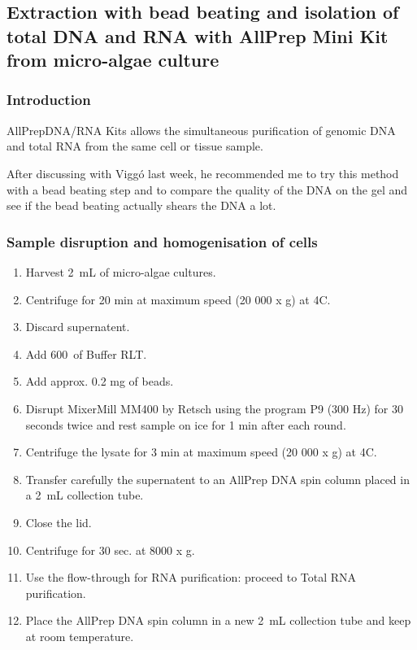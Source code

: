 \subsection{Extraction with bead beating and isolation of total DNA and RNA with  AllPrep Mini Kit from micro-algae culture}
\label{task:20180227_cj0}

\subsubsection{Introduction}
AllPrep\cR DNA/RNA Kits allows the simultaneous purification of genomic DNA and total RNA from the same cell or tissue sample.

After discussing with Viggó last week, he recommended me to try this method with a bead beating step and to compare the quality of the DNA on the gel and see if the bead beating actually shears the DNA a lot.

\subsubsection{Sample disruption and homogenisation of cells}

\begin{enumerate}
\item Harvest 2~mL of micro-algae cultures.
\item Centrifuge for 20 min at maximum speed (20 000 x g) at 4\degree C.
\item Discard supernatent.
\item Add 600~\uL of Buffer RLT.
\item Add approx. 0.2 mg of beads. 
\item Disrupt MixerMill MM400 by Retsch using the program P9 (300 Hz) for 30 seconds twice and rest sample on ice for 1 min after each round.
\item Centrifuge the lysate for 3 min at maximum speed (20 000 x g) at 4\degree C.
\item Transfer carefully the supernatent to an AllPrep DNA spin column placed in a 2~mL collection tube.
\item Close the lid.
\item Centrifuge for 30 sec. at 8000 x g.
\item Use the flow-through for RNA purification: proceed to Total RNA purification.
\item Place the AllPrep DNA spin column in a new 2~mL collection tube and keep at room temperature.
\end{enumerate}

